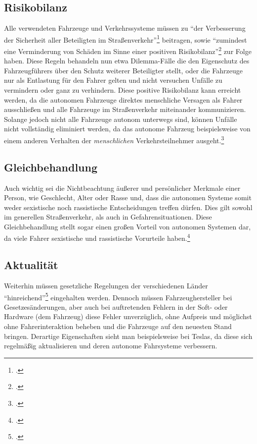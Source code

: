 \documentclass[a4paper, 12pt, openany]{book}
\begin{document}
            \subsection{Risikobilanz}
                Alle verwendeten Fahrzeuge und Verkehrssysteme müssen zu \enquote{der Verbesserung der Sicherheit aller Beteiligten im Straßenverkehr}\footcite[11]{ethikkommission} beitragen, sowie \enquote{zumindest eine Verminderung von Schäden im Sinne einer positiven Risikobilanz}\footcite[10]{ethikkommission} zur Folge haben. Diese Regeln behandeln nun etwa Dilemma-Fälle die den Eigenschutz des Fahrzeugführers über den Schutz weiterer Beteiligter stellt, oder die Fahrzeuge nur als Entlastung für den Fahrer gelten und nicht versuchen Unfälle zu vermindern oder ganz zu verhindern.
                Diese positive Risikobilanz kann erreicht werden, da die autonomen Fahrzeuge direktes menschliche Versagen als Fahrer ausschließen und alle Fahrzeuge im Straßenverkehr miteinander kommunizieren. Solange jedoch nicht alle Fahrzeuge autonom unterwegs sind, können Unfälle nicht vollständig eliminiert werden, da das autonome Fahrzeug beispielsweise von einem anderen Verhalten der \textit{menschlichen} Verkehrsteilnehmer ausgeht.\footcite[451]{spitzer2016sollte}
            
            \subsection{Gleichbehandlung}
                Auch wichtig sei die Nichtbeachtung äußerer und persönlicher Merkmale einer Person, wie Geschlecht, Alter oder Rasse und, dass die autonomen Systeme somit weder sexistische noch rassistische Entscheidungen treffen dürfen. Dies gilt sowohl im generellen Straßenverkehr, als auch in Gefahrensituationen. Diese Gleichbehandlung stellt sogar einen großen Vorteil von autonomen Systemen dar, da viele Fahrer sexistische und rassistische Vorurteile haben.\footcite[11]{ethikkommission}
            
            \subsection{Aktualität}
                Weiterhin müssen gesetzliche Regelungen der verschiedenen Länder \enquote{hinreichend}\footcite[11]{ethikkommission} eingehalten werden. Dennoch müssen Fahrzeughersteller bei Gesetzesänderungen, aber auch bei auftretenden Fehlern in der Soft- oder Hardware (dem Fahrzeug) diese Fehler unverzüglich, ohne Aufpreis und möglichst ohne Fahrerinteraktion beheben und die Fahrzeuge auf den neuesten Stand bringen. Derartige Eigenschaften sieht man beispielsweise bei Teslas, da diese sich regelmäßig aktualisieren und deren autonome Fahrsysteme verbessern.
            
\end{document}
